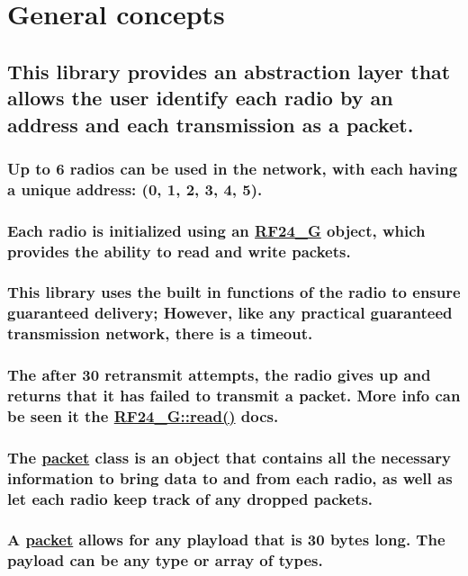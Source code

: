 \section*{General concepts}

\subsection*{This library provides an abstraction layer that allows the user identify each radio by an address and each transmission as a packet.}

\subsubsection*{Up to 6 radios can be used in the network, with each having a unique address\+: (0, 1, 2, 3, 4, 5).}

\subsubsection*{Each radio is initialized using an \hyperlink{class_r_f24___g}{R\+F24\+\_\+G} object, which provides the ability to read and write packets.}

\subsubsection*{This library uses the built in functions of the radio to ensure guaranteed delivery; However, like any practical guaranteed transmission network, there is a timeout.}

\subsubsection*{The after 30 retransmit attempts, the radio gives up and returns that it has failed to transmit a packet. More info can be seen it the \hyperlink{class_r_f24___g_a00d022e73f823087f1b2185545afbaa4}{R\+F24\+\_\+\+G\+::read()} docs.}

\subsubsection*{The \hyperlink{classpacket}{packet} class is an object that contains all the necessary information to bring data to and from each radio, as well as let each radio keep track of any dropped packets.}

\subsubsection*{A \hyperlink{classpacket}{packet} allows for any playload that is 30 bytes long. The payload can be any type or array of types.}

